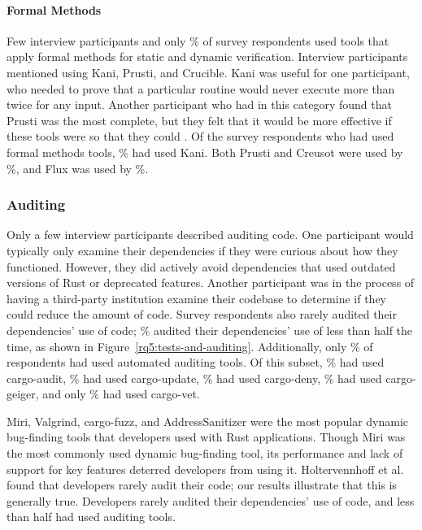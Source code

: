 \paragraph{Formal Methods} Few interview participants and only \% of survey respondents used tools that apply formal methods for static and dynamic verification. Interview participants mentioned using Kani, Prusti, and Crucible. Kani was useful for one participant, who needed to prove that a particular routine would never execute more than twice for any input. Another participant who had  in this category found that Prusti was the most complete, but they felt that it would be more effective if these tools were  so that they could . Of the survey respondents who had used formal methods tools, \% had used Kani. Both Prusti and Creusot were used by \%, and Flux was used by \%.

\subsubsection{Auditing} Only a few interview participants described auditing \unsafe code. One participant would typically only examine their dependencies if they were curious about how they functioned. However, they did actively avoid dependencies that used outdated versions of Rust or deprecated features. Another participant was in the process of having a third-party institution examine their codebase to determine if they could reduce the amount of \unsafe code. Survey respondents also rarely audited their dependencies' use of \unsafe code; \noauditing\% audited their dependencies' use of \unsafe less than half the time, as shown in Figure~\ref{rq5:tests-and-auditing}. Additionally, only \auditingtoolpercent\% of respondents had used automated auditing tools. Of this subset, \% had used cargo-audit, \% had used cargo-update, \% had used cargo-deny, \% had used cargo-geiger, and only \% had used cargo-vet.

\rsqfive Miri, Valgrind, cargo-fuzz, and AddressSanitizer were the most popular dynamic bug-finding tools that developers used with Rust applications. Though Miri was the most commonly used dynamic bug-finding tool, its performance and lack of support for key features deterred developers from using it. Holtervennhoff et al.~\cite{holtervennhoff23} found that developers rarely audit their code; our results illustrate that this is generally true. Developers rarely audited their dependencies' use of \unsafe code, and less than half had used auditing tools. 

